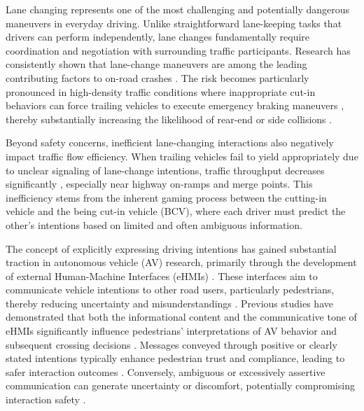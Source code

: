 \documentclass[manuscript,review]{acmart}
\begin{document}
Lane changing represents one of the most challenging and potentially dangerous maneuvers in everyday driving. Unlike straightforward lane-keeping tasks that drivers can perform independently, lane changes fundamentally require coordination and negotiation with surrounding traffic participants. Research has consistently shown that lane-change maneuvers are among the leading contributing factors to on-road crashes \cite{retallack2019current, schieben2019designing, yang2018effect}. The risk becomes particularly pronounced in high-density traffic conditions where inappropriate cut-in behaviors can force trailing vehicles to execute emergency braking maneuvers \cite{yang2018effect}, thereby substantially increasing the likelihood of rear-end or side collisions \cite{deb2018investigating, retallack2019current}.

Beyond safety concerns, inefficient lane-changing interactions also negatively impact traffic flow efficiency. When trailing vehicles fail to yield appropriately due to unclear signaling of lane-change intentions, traffic throughput decreases significantly \cite{zheng2010impact}, especially near highway on-ramps and merge points. This inefficiency stems from the inherent gaming process between the cutting-in vehicle and the being cut-in vehicle (BCV), where each driver must predict the other's intentions based on limited and often ambiguous information.

The concept of explicitly expressing driving intentions has gained substantial traction in autonomous vehicle (AV) research, primarily through the development of external Human-Machine Interfaces (eHMIs) \cite{bazilinskyy2019survey, schieben2019designing}. These interfaces aim to communicate vehicle intentions to other road users, particularly pedestrians, thereby reducing uncertainty and misunderstandings \cite{dey2019pedestrian, habibovic2018communicating}. Previous studies have demonstrated that both the informational content and the communicative tone of eHMIs significantly influence pedestrians' interpretations of AV behavior and subsequent crossing decisions \cite{carmona2021ehmi, lee2025not, mahadevan2018communicating, lee2022learning}. Messages conveyed through positive or clearly stated intentions typically enhance pedestrian trust and compliance, leading to safer interaction outcomes \cite{ackermann2019deceleration, bengler2020hmi, deb2020communicating, lee2022learning}. Conversely, ambiguous or excessively assertive communication can generate uncertainty or discomfort, potentially compromising interaction safety \cite{ames2017interpersonal, she2021shaping, darrehshourian2021communicating}.
\end{document}
